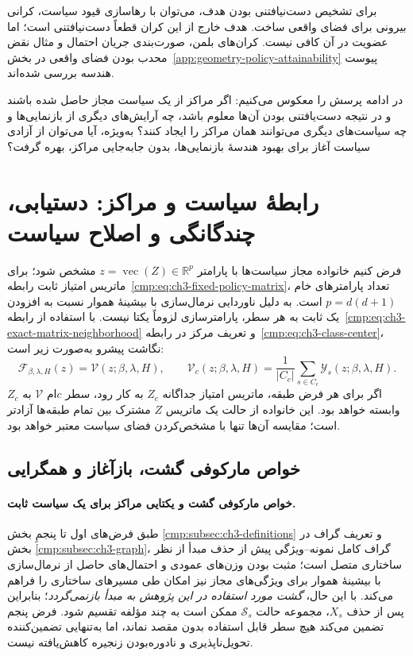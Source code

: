 برای تشخیص دست‌نیافتنی بودن هدف، می‌توان با رهاسازی قیود سیاست، کرانی بیرونی برای فضای واقعی ساخت. هدف خارج از این کران قطعاً دست‌نیافتنی است؛ اما عضویت در آن کافی نیست. کران‌های بلمن، صورت‌بندی جریان احتمال و مثال نقض محدب بودن فضای واقعی در بخش~\ref{app:geometry-policy-attainability} پیوست هندسه بررسی شده‌اند.

در ادامه پرسش را معکوس می‌کنیم: اگر مراکز از یک سیاست مجاز حاصل شده باشند و در نتیجه دست‌یافتنی بودن آن‌ها معلوم باشد، چه آرایش‌های دیگری از بازنمایی‌ها و چه سیاست‌های دیگری می‌توانند همان مراکز را ایجاد کنند؟ به‌ویژه، آیا می‌توان از آزادی سیاست آغاز برای بهبود هندسهٔ بازنمایی‌ها، بدون جابه‌جایی مراکز، بهره گرفت؟

\section{رابطهٔ سیاست و مراکز: دستیابی، چندگانگی و اصلاح سیاست}
\label{cmp:sec:ch3-inverse-center-policy}

فرض کنیم خانواده مجاز سیاست‌ها با پارامتر $z=\operatorname{vec}(Z)\in\mathbb R^p$ مشخص شود؛ برای ماتریس امتیاز ثابت رابطه~\eqref{cmp:eq:ch3-fixed-policy-matrix}، تعداد پارامترهای خام $p=d(d+1)$ است. به دلیل ناوردایی نرمال‌سازی با بیشینهٔ هموار نسبت به افزودن یک ثابت به هر سطر، پارامترسازی لزوماً یکتا نیست. با استفاده از رابطه~\eqref{cmp:eq:ch3-exact-matrix-neighborhood} و تعریف مرکز در رابطه~\eqref{cmp:eq:ch3-class-center}، نگاشت پیشرو به‌صورت زیر است:
\begin{equation}\label{cmp:eq:ch3-center-forward-map}
\mathcal F_{\beta,\lambda,H}(z)=\mathcal V(z;\beta,\lambda,H),
\qquad
\mathcal V_c(z;\beta,\lambda,H)=
\frac{1}{|C_c|}\sum_{s\in C_c}\mathscr Y_s(z;\beta,\lambda,H).
\end{equation}
اگر برای هر فرض طبقه، ماتریس امتیاز جداگانه $Z_c$ به کار رود، سطر $c$ام $\mathcal V$ به $Z_c$ وابسته خواهد بود. این خانواده از حالت یک ماتریس $Z$ مشترک بین تمام طبقه‌ها آزادتر است؛ مقایسه آن‌ها تنها با مشخص‌کردن فضای سیاست معتبر خواهد بود.




\subsection{خواص مارکوفی گشت، بازآغاز و همگرایی}

\paragraph{خواص مارکوفی گشت و یکتایی مراکز برای یک سیاست ثابت.}
طبق فرض‌های اول تا پنجمِ بخش
\ref{cmp:subsec:ch3-definitions}
و تعریف گراف در بخش
\ref{cmp:subsec:ch3-graph}،
گراف کامل نمونه--ویژگی پیش از
حذف مبدأ از نظر ساختاری متصل است؛
مثبت بودن وزن‌های عمودی و
احتمال‌های حاصل از نرمال‌سازی با بیشینهٔ هموار برای ویژگی‌های
مجاز نیز امکان طی مسیرهای ساختاری
را فراهم می‌کند. با این حال،
\emph{گشت مورد استفاده در این پژوهش
به مبدأ بازنمی‌گردد}؛ بنابراین
پس از حذف $X_s$، مجموعه حالت
$\mathcal S_s$ ممکن است به
چند مؤلفه تقسیم شود.
فرض پنجم تضمین می‌کند هیچ سطر
قابل استفاده بدون مقصد نماند،
اما به‌تنهایی تضمین‌کننده
تحویل‌ناپذیری و نادوره‌بودن
زنجیره کاهش‌یافته نیست.

